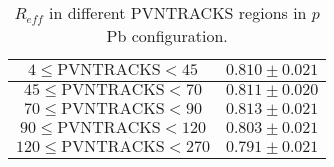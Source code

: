 \begin{table}[H]
\centering
\caption{$R_{eff}$ in different PVNTRACKS regions in $p$Pb configuration.}
\begin{center}
\begin{tabular}{c|c}
\hline
$4 \leq \mathrm{PVNTRACKS} < 45$ & $0.810 \pm 0.021$ \\
\hline
$45 \leq \mathrm{PVNTRACKS} < 70$ & $0.811 \pm 0.020$ \\
\hline
$70 \leq \mathrm{PVNTRACKS} < 90$ & $0.813 \pm 0.021$ \\
\hline
$90 \leq \mathrm{PVNTRACKS} < 120$ & $0.803 \pm 0.021$ \\
\hline
$120 \leq \mathrm{PVNTRACKS} < 270$ & $0.791 \pm 0.021$ \\
\hline
\end{tabular}
\end{center}
\label{ReffTable_PVNTRACKS_pPb}
\end{table}

